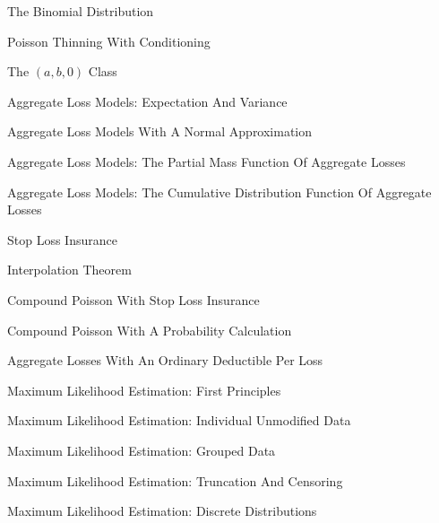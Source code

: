 The Binomial Distribution

Poisson Thinning With Conditioning

The $(a,b,0)$ Class

Aggregate Loss Models: Expectation And Variance

Aggregate Loss Models With A Normal Approximation

Aggregate Loss Models: The Partial Mass Function Of Aggregate Losses

Aggregate Loss Models: The Cumulative Distribution Function Of Aggregate Losses

Stop Loss Insurance

Interpolation Theorem

Compound Poisson With Stop Loss Insurance

Compound Poisson With A Probability Calculation

Aggregate Losses With An Ordinary Deductible Per Loss

Maximum Likelihood Estimation: First Principles

Maximum Likelihood Estimation: Individual Unmodified Data

Maximum Likelihood Estimation: Grouped Data

Maximum Likelihood Estimation: Truncation And Censoring

Maximum Likelihood Estimation: Discrete Distributions